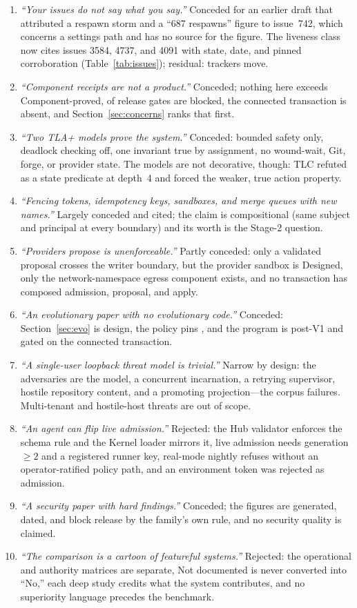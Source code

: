 \documentclass[journal]{IEEEtran}
\newcommand{\Designed}{\textsf{Designed}}
\newcommand{\ComponentProved}{\textsf{Component-proved}}
\newcommand{\NotDoc}{\textsf{Not documented}}
\newcommand{\code}[1]{\texttt{\detokenize{#1}}}
\begin{document}
{\footnotesize
\begin{enumerate}
\item \emph{``Your issues do not say what you say.''} Conceded for an earlier
draft that attributed a respawn storm and a ``687 respawns'' figure to
issue~742, which concerns a settings path and has no source for the figure.
The liveness class now cites issues 3584, 4737, and 4091 with state, date, and
pinned corroboration (Table~\ref{tab:issues}); residual: trackers move.
\item \emph{``Component receipts are not a product.''} Conceded; nothing here
exceeds \ComponentProved, \EvidenceReleaseBlocked{} of
\EvidenceReleaseEvaluated{} release gates are blocked, the connected
transaction is absent, and Section~\ref{sec:concerns} ranks that first.
\item \emph{``Two TLA+ models prove the system.''} Conceded: bounded safety
only, deadlock checking off, one invariant true by assignment, no wound-wait,
Git, forge, or provider state. The models are not decorative, though: TLC
refuted \code{NoDispatchAfterStop} as a state predicate at depth~4 and forced
the weaker, true action property.
\item \emph{``Fencing tokens, idempotency keys, sandboxes, and merge queues with
new names.''} Largely conceded and cited; the claim is compositional (same
subject and principal at every boundary) and its worth is the Stage-2 question.
\item \emph{``Providers propose is unenforceable.''} Partly conceded: only a
validated proposal crosses the writer boundary, but the provider sandbox is
\Designed, only the network-namespace egress component exists, and no
transaction has composed admission, proposal, and apply.
\item \emph{``An evolutionary paper with no evolutionary code.''} Conceded:
Section~\ref{sec:evo} is design, the policy pins
\code{evolutionary_authority=false}, and the program is post-V1 and gated on
the connected transaction.
\item \emph{``A single-user loopback threat model is trivial.''} Narrow by
design: the adversaries are the model, a concurrent incarnation, a retrying
supervisor, hostile repository content, and a promoting projection---the
corpus failures. Multi-tenant and hostile-host threats are out of scope.
\item \emph{``An agent can flip live admission.''} Rejected: the Hub validator
enforces the schema rule and the Kernel loader mirrors it, live admission
needs generation $\geq 2$ and a registered runner key, real-mode nightly
refuses without an operator-ratified policy path, and an environment token was
rejected as admission.
\item \emph{``A security paper with \EvidenceAuditHard{} hard findings.''}
Conceded; the figures are generated, dated, and block release by the family's
own rule, and no security quality is claimed.
\item \emph{``The comparison is a cartoon of featureful systems.''} Rejected:
the operational and authority matrices are separate, \NotDoc{} is never
converted into ``No,'' each deep study credits what the system contributes,
and no superiority language precedes the benchmark.
\end{enumerate}
}
\end{document}
